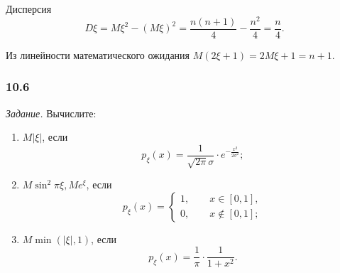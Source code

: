Дисперсия
$$D \xi =
M \xi^2 - \left( M \xi \right)^2 =
\frac{n \left( n+1 \right) }{4} - \frac{n^2}{4} =
\frac{n}{4}.$$

Из линейности математического ожидания $M \left( 2 \xi + 1 \right) = 2M \xi + 1 = n + 1$.

\subsubsection*{10.6}

\textit{Задание.} Вычислите:
\begin{enumerate}[label=\alph*)]
\item $M \left| \xi \right| $, если
$$p_{ \xi } \left( x \right) =
\frac{1}{ \sqrt{2 \pi } \sigma } \cdot e^{- \frac{x^2}{2 \sigma^2}};$$
\item $M \sin^2 \pi \xi, Me^{ \xi }$, если
$$p_{ \xi } \left( x \right) =
\begin{cases}
1, \qquad x \in \left[ 0, 1 \right], \\
0, \qquad x \notin \left[ 0, 1 \right];
\end{cases}$$
\item $M \min \left( \left| \xi \right|, 1 \right) $, если
$$p_{ \xi } \left( x \right) =
\frac{1}{ \pi } \cdot \frac{1}{1+x^2}.$$
\end{enumerate}

